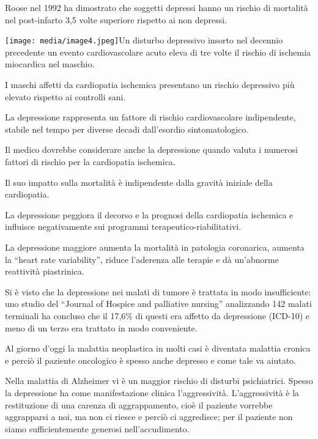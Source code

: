 \documentclass[]{article}
\begin{document}
Roose nel 1992 ha dimostrato che soggetti depressi hanno un rischio di
mortalità nel post-infarto 3,5 volte superiore rispetto ai non depressi.

\texttt{[image: media/image4.jpeg]}Un
disturbo depressivo insorto nel decennio precedente un evento
cardiovascolare acuto eleva di tre volte il rischio di ischemia
miocardica nel maschio.

I maschi affetti da cardiopatia ischemica presentano un rischio
depressivo più elevato rispetto ai controlli sani.

La depressione rappresenta un fattore di rischio cardiovascolare
indipendente, stabile nel tempo per diverse decadi dall'esordio
sintomatologico.

Il medico dovrebbe considerare anche la depressione quando valuta i
numerosi fattori di rischio per la cardiopatia ischemica.

Il suo impatto sulla mortalità è indipendente dalla gravità iniziale
della cardiopatia.

La depressione peggiora il decorso e la prognosi della cardiopatia
ischemica e influisce negativamente sui programmi
terapeutico-riabilitativi.

La depressione maggiore aumenta la mortalità in patologia coronarica,
aumenta la ``heart rate variability'', riduce l'aderenza alle terapie e
dà un'abnorme reattività piastrinica.

Si è visto che la depressione nei malati di tumore è trattata in modo
insufficiente: uno studio del ``Journal of Hospice and palliative
nursing'' analizzando 142 malati terminali ha concluso che il 17,6\% di
questi era affetto da depressione (ICD-10) e meno di un terzo era
trattato in modo conveniente.

Al giorno d'oggi la malattia neoplastica in molti casi è diventata
malattia cronica e perciò il paziente oncologico è spesso anche depresso
e come tale va aiutato.

Nella malattia di Alzheimer vi è un maggior rischio di disturbi
psichiatrici. Spesso la depressione ha come manifestazione clinica
l'aggressività. L'aggressività è la restituzione di una carenza di
aggrappamento, cioè il paziente vorrebbe aggrapparsi a noi, ma non ci
riesce e perciò ci aggredisce; per il paziente non siamo
sufficientemente generosi nell'accudimento.
\end{document}
